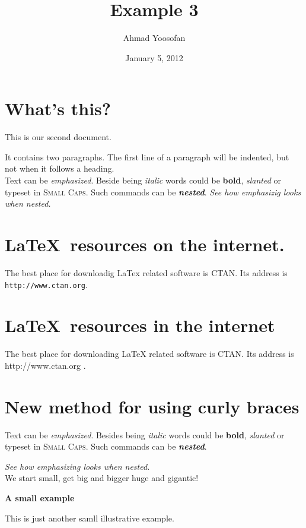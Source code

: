 \documentclass[a4paper, 11pt]{article}
\begin{document}
\title{Example 3}
\author{Ahmad Yoosofan}
\date{January 5, 2012}
\maketitle
\section{What's this?}
This                              is   our 
      second               document. 
	
It contains two paragraphs. The first line of a paragraph will be indented, but not when it follows a heading.\\ Text can be \emph{emphasized}.
Beside being  \textit{italic} words could be \textbf{bold}, 
\textsl{slanted} or typeset in \textsc{Small Caps}.
Such commands can be \textit{\textbf{nested}}.
\emph{See how  \emph{emphasizig} looks when nested.}


\section{\textsf{\LaTeX\ resources on the internet.}}
The best place for downloadig LaTex related software is CTAN. 
Its address is \texttt{http://www.ctan.org}.
\\
\section{\sffamily\LaTeX\ resources in the internet}
The best place for downloading LaTeX related software is CTAN.
Its address is \ttfamily	http://www.ctan.org \rmfamily.

\section{New method for using curly braces}
{ 
Text can be {\em emphasized}.
Besides being {\itshape italic} words could be {\bfseries bold},
{\slshape slanted} or typeset in {\scshape Small Caps}.
Such commands can be {\itshape \bfseries nested}.}

{\em See how {\em emphasizing} looks when nested.}\\


\noindent  \tiny We \scriptsize start \footnotesize \small small,
\normalsize get \large big \Large and \LARGE bigger
\huge huge and \Huge gigantic!
\\
\begin{huge}
\bfseries
A small example

\end{huge}
\bigskip
This is just another samll illustrative example.

\end{document}
